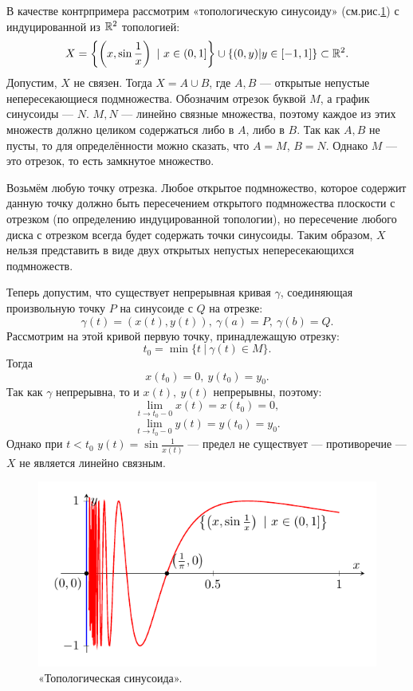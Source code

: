 \begin{example}
    В качестве контрпримера рассмотрим «топологическую синусоиду» (см.рис.\ref{fig:c2.2}) с индуцированной из $\mathbb{R}^2$ топологией:
    \[X = \left\{\left(x, \sin{\frac{1}{x}}\right) \ |\ x \in (0,1]\right\} \cup \left\{(0,y) | y \in [-1,1]\right\} \subset \R^2.\]
    Допустим, $X$ не связен. Тогда $X = A \cup B$, где $A,B$ — открытые непустые непересекающиеся подмножества. Обозначим отрезок буквой $M$, а график синусоиды — $N$. $M, N$ — линейно связные множества, поэтому каждое из этих множеств должно целиком содержаться либо в $A$, либо в $B$. Так как $A,B$ не пусты, то для определённости можно сказать, что $A = M$, $B = N$. Однако $M$ — это отрезок, то есть замкнутое множество.
    
    Возьмём любую точку отрезка. Любое открытое подмножество, которое содержит данную точку должно быть пересечением открытого подмножества плоскости с отрезком (по определению индуцированной топологии), но пересечение любого диска с отрезком всегда будет содержать точки синусоиды. Таким образом, $X$ нельзя представить в виде двух открытых непустых непересекающихся подмножеств.

    Теперь допустим, что существует непрерывная кривая $\gamma$, соединяющая произвольную точку $P$ на синусоиде с $Q$ на отрезке:
    \[\gamma(t) = (x(t),y(t)), \ \gamma(a) = P, \ \gamma(b) = Q.\]
    Рассмотрим на этой кривой первую точку, принадлежащую отрезку:
    \[t_0 = \min\{t \ |\ \gamma(t) \in M\}.\]
    Тогда \[x(t_0) = 0, \ y(t_0) = y_0.\]
    Так как $\gamma$ непрерывна, то и $x(t), \ y(t)$ непрерывны, поэтому:
    \[\lim\limits_{t \to t_0 - 0}x(t) = x(t_0) = 0,\]
    \[\lim\limits_{t \to t_0 - 0}y(t) = y(t_0) = y_0.\]
    Однако при $t < t_0$ $y(t) = \sin{\frac{1}{x(t)}}$ — предел не существует — противоречие — $X$ не является линейно связным.


    \begin{figure}[htbp]
        \centering
        \includegraphics[scale=1]{images/c2.2.pdf}
        \caption{«Топологическая синусоида».}
        \label{fig:c2.2}
    \end{figure}
\end{example}


